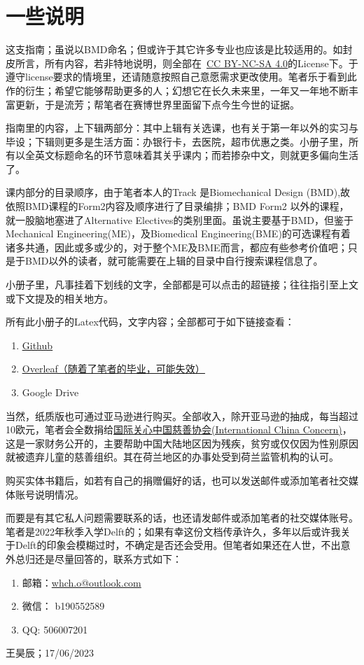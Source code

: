 \section{一些说明}
这支指南；虽说以BMD命名；但或许于其它许多专业也应该是比较适用的。如封皮所言，所有内容，若非特地说明，则全部在\ccbyncsa\ \href{http://creativecommons.org/licenses/by-nc-sa/4.0/}{\uline{CC BY-NC-SA 4.0}}的License下。于遵守license要求的情境里，还请随意按照自己意愿需求更改使用。笔者乐于看到此作的衍生；希望它能够帮助更多的人；幻想它在长久未来里，一年又一年地不断丰富更新，于是流芳；帮笔者在赛博世界里面留下点今生今世的证据。

指南里的内容，上下辑两部分：其中上辑有关选课，也有关于第一年以外的实习与毕设；下辑则更多是生活方面：办银行卡，去医院，超市优惠之类。小册子里，所有以全英文标题命名的环节意味着其关乎课内；而若掺杂中文，则就更多偏向生活了。

课内部分的目录顺序，由于笔者本人的Track 是Biomechanical Design (BMD),故依照BMD课程的Form2内容及顺序进行了目录编排；BMD Form2 以外的课程，就一股脑地塞进了Alternative Electives的类别里面。虽说主要基于BMD，但鉴于Mechanical Engineering(ME)，及Biomedical Engineering(BME)的可选课程有着诸多共通，因此或多或少的，对于整个ME及BME而言，都应有些参考价值吧；只是于BMD以外的读者，就可能需要在上辑的目录中自行搜索课程信息了。

小册子里，凡事挂着下划线的文字，全部都是可以点击的超链接；往往指引至上文或下文提及的相关地方。

所有此小册子的Latex代码，文字内容；全部都可于如下链接查看：
\begin{enumerate}
\item \href{https://github.com/HochanWang/BMD-ZhiNan}{\uline{Github}}
\item \href{https://www.overleaf.com/9181971742xyhrjrdxdzkt}{\uline{Overleaf（随着了笔者的毕业，可能失效）}}
\item Google Drive
\end{enumerate}

当然，纸质版也可通过亚马逊进行购买。全部收入，除开亚马逊的抽成，每当超过10欧元，笔者会全数捐给\href{https://chinaconcern.org/zh_hans/?fbclid=IwAR263C_R6_XiYRZrUrad-3TvXTMNcJAJWlTMwOiNIhiyCmAGR3GjPwBWH0w}{\uline{国际关心中国慈善协会(International China Concern)}}，这是一家财务公开的，主要帮助中国大陆地区因为残疾，贫穷或仅仅因为性别原因就被遗弃儿童的慈善组织。其在荷兰地区的办事处受到荷兰监管机构的认可。

购买实体书籍后，如若有自己的捐赠偏好的话，也可以发送邮件或添加笔者社交媒体账号说明情况。

而要是有其它私人问题需要联系的话，也还请发邮件或添加笔者的社交媒体账号。笔者是2022年秋季入学Delft的；如果有幸这份文档传承许久，多年以后或许我关于Delft的印象会模糊过时，不确定是否还会受用。但笔者如果还在人世，不出意外总归还是尽量回答的，联系方式如下：
\begin{enumerate}
\item 邮箱：\href{mailto:whch.o@outlook.com}{whch.o@outlook.com}
\item 微信： b190552589
\item QQ: 506007201
\end{enumerate}

\begin{flushright}
王昊辰；17/06/2023
\end{flushright}
